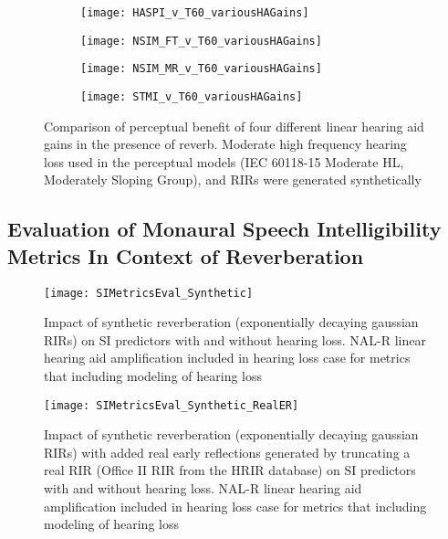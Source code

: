 \begin{figure}[H]
	\centering
	\begin{subfigure}[b]{0.49\textwidth}
		\centering
		\texttt{[image: HASPI\_v\_T60\_variousHAGains]}
	\end{subfigure}
	\hfill
	\begin{subfigure}[b]{0.49\textwidth}
		\centering
		\texttt{[image: NSIM\_FT\_v\_T60\_variousHAGains]}
	\end{subfigure}
	\hfill
	\begin{subfigure}[b]{0.49\textwidth}
		\centering
		\texttt{[image: NSIM\_MR\_v\_T60\_variousHAGains]}
	\end{subfigure}
	\hfill
	\begin{subfigure}[b]{0.49\textwidth}
		\centering
		\texttt{[image: STMI\_v\_T60\_variousHAGains]}
	\end{subfigure}
	\hfill
	\caption{Comparison of perceptual benefit of four different linear hearing aid gains in the presence of reverb. Moderate high frequency hearing loss used in the perceptual models (IEC 60118-15 Moderate HL, Moderately Sloping Group), and RIRs were generated synthetically}
	\label{fig:HA_GainComparison}
\end{figure}



\subsection{Evaluation of Monaural Speech Intelligibility Metrics In Context of Reverberation}


\begin{figure}[H]
	\texttt{[image: SIMetricsEval\_Synthetic]}
	\centering
	\caption{Impact of synthetic reverberation (exponentially decaying gaussian RIRs) on SI predictors with and without hearing loss. NAL-R linear hearing aid amplification included in hearing loss case for metrics that including modeling of hearing loss}
	\label{fig:SIMetricsEval_Synthetic}
\end{figure}

\begin{figure}[H]
	\texttt{[image: SIMetricsEval\_Synthetic\_RealER]}
	\centering
	\caption{Impact of synthetic reverberation (exponentially decaying gaussian RIRs) with added real early reflections generated by truncating a real RIR  (Office II RIR from the HRIR database) on SI predictors with and without hearing loss. NAL-R linear hearing aid amplification included in hearing loss case for metrics that including modeling of hearing loss}
	\label{fig:SIMetricsEval_Synthetic_RealER}
\end{figure}

